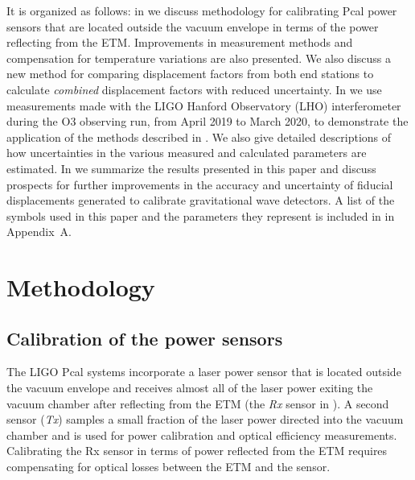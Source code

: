 \documentclass[12pt,a4paper,final]{iopart}
\begin{document}
 It is organized as follows:  in  we discuss methodology for calibrating Pcal power sensors that are located outside the vacuum envelope in terms of the power reflecting from the ETM. Improvements in measurement methods and compensation for temperature variations are also presented.  We also discuss a new method for comparing displacement factors from both end stations to calculate {\em combined} displacement factors with reduced uncertainty.  In  we use measurements made with the LIGO Hanford Observatory (LHO) interferometer during the O3 observing run, from April 2019 to March 2020, to demonstrate the application of the methods described in .  We also give detailed descriptions of how uncertainties in the various measured and calculated parameters are estimated.  In  we summarize the results presented in this paper and discuss prospects for further improvements in the accuracy and uncertainty of fiducial displacements generated to calibrate gravitational wave detectors.  A list of the symbols used in this paper and the parameters they represent is included  in  in Appendix~A.
%
\section{Methodology}
\label{sec:method}
%
\subsection{Calibration of the power sensors}
\label{subsec:MethodSensorcal}
%
The LIGO Pcal systems incorporate a laser power sensor that is located outside the vacuum envelope and receives almost all of the laser power exiting the vacuum chamber after reflecting from the ETM (the {\em Rx} sensor in ).  A second sensor  ({\em Tx}) samples a small fraction of the laser power directed into the vacuum chamber and is used for power calibration and optical efficiency measurements.  Calibrating the Rx sensor in terms of power reflected from the ETM requires compensating for optical losses between the ETM and the sensor.
\end{document}
